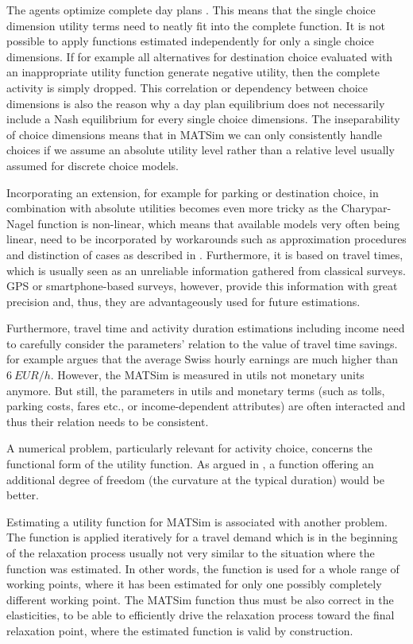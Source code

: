 The agents optimize complete day plans \citep[see also][Section 6.3.1]{MATSim_Userguide_2014}. This means that the single choice dimension utility terms need to neatly fit into the complete function. It is not possible to apply functions estimated independently for only a single choice dimensions. If for example all alternatives for destination choice evaluated with an inappropriate utility function generate negative utility, then the complete activity is simply dropped. This correlation or dependency between choice dimensions is also the reason why a day plan equilibrium does not necessarily include a Nash equilibrium for every single choice dimensions. The inseparability of choice dimensions means that in MATSim we can only consistently handle choices if we assume an absolute utility level rather than a relative level usually assumed for discrete choice models. 

Incorporating an extension, for example for parking or destination choice, in combination with absolute utilities becomes even more tricky as the Charypar-Nagel function is non-linear, which means that available models very often being linear, need to be incorporated by workarounds such as approximation procedures and distinction of cases as described in \citet[][p.75ff]{Horni_PhDThesis_2013}. Furthermore, it is based on travel times, which is usually seen as an unreliable information gathered from classical surveys. GPS or smartphone-based surveys, however, provide this information with great precision and, thus, they are advantageously used for future estimations.

Furthermore, travel time and activity duration estimations including income need to carefully consider the parameters' relation to the value of travel time savings. \citet[][p.276]{MeisterEtAl_SVT_2009} for example argues that the average Swiss hourly earnings are much higher than $6\ EUR/h$. However, the MATSim is measured in utils not monetary units anymore. But still, the parameters in utils and monetary terms (such as tolls, parking costs, fares etc., or income-dependent attributes) are often interacted and thus their relation needs to be consistent.

A numerical problem, particularly relevant for activity choice, concerns the functional form of the utility function. As argued in \citet[][p.33]{MATSim_Userguide_2014}, a function offering an additional degree of freedom (the curvature at the typical duration) would be better.

Estimating a utility function for MATSim is associated with another problem. The function is applied iteratively for a travel demand which is in the beginning of the relaxation process usually not very similar to the situation where the function was estimated. In other words, the function is used for a whole range of working points, where it has been estimated for only one  possibly completely different working point. The MATSim function thus must be also correct in the elasticities, to be able to efficiently drive the relaxation process toward the final relaxation point, where the estimated function is valid by construction. 

